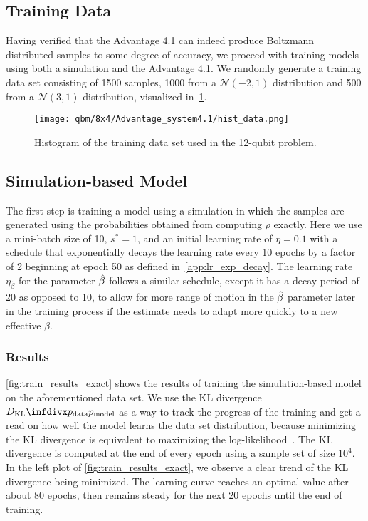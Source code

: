 \subsection{Training Data}
Having verified that the Advantage 4.1 can indeed produce Boltzmann distributed samples to some degree of accuracy, we proceed with training models using both a simulation and the Advantage 4.1.
We randomly generate a training data set consisting of 1500 samples, 1000 from a \( \mathcal{N}(-2, 1) \) distribution and 500 from a \( \mathcal{N}(3, 1) \) distribution, visualized in~\cref{fig:hist_data}.
\begin{figure}[!htb]
    \begin{center}
        \texttt{[image: qbm/8x4/Advantage\_system4.1/hist\_data.png]}
    \end{center}
    \caption{
        Histogram of the training data set used in the 12-qubit problem.
    }
    \label{fig:hist_data}
\end{figure}

\subsection{Simulation-based Model}
The first step is training a model using a simulation in which the samples are generated using the probabilities obtained from computing \( \rho \) exactly.
Here we use a mini-batch size of 10, \( s^* = 1 \), and an initial learning rate of \( \eta = 0.1 \) with a schedule that exponentially decays the learning rate every 10 epochs by a factor of 2 beginning at epoch 50 as defined in~\cref{app:lr_exp_decay}.
The learning rate \( \eta_{\hat{\beta}} \) for the parameter \( \hat{\beta} \) follows a similar schedule, except it has a decay period of 20 as opposed to 10, to allow for more range of motion in the \( \hat{\beta} \) parameter later in the training process if the estimate needs to adapt more quickly to a new effective \( \beta \).

\subsubsection{Results}\label{sec:qbm_simulation_results}
\cref{fig:train_results_exact} shows the results of training the simulation-based model on the aforementioned data set.
We use the KL divergence \( \DKL{\pdata}{\pmodel} \) as a way to track the progress of the training and get a read on how well the model learns the data set distribution, because minimizing the KL divergence is equivalent to maximizing the log-likelihood~\cite{murphy_2012}.
The KL divergence is computed at the end of every epoch using a sample set of size \( 10^4 \).
In the left plot of \cref{fig:train_results_exact}, we observe a clear trend of the KL divergence being minimized.
The learning curve reaches an optimal value after about 80 epochs, then remains steady for the next 20 epochs until the end of training.

